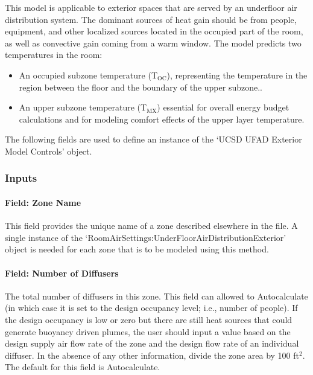 This model is applicable to exterior spaces that are served by an underfloor air distribution system. The dominant sources of heat gain should be from people, equipment, and other localized sources located in the occupied part of the room, as well as convective gain coming from a warm window. The model predicts two temperatures in the room:

\begin{itemize}
\item
  An occupied subzone temperature (T\(_{\mathrm{OC}}\)), representing the temperature in the region between the floor and the boundary of the upper subzone..
\item
  An upper subzone temperature (T\(_{\mathrm{MX}}\)) essential for overall energy budget calculations and for modeling comfort effects of the upper layer temperature.
\end{itemize}

The following fields are used to define an instance of the `UCSD UFAD Exterior Model Controls' object.

\subsubsection{Inputs}\label{inputs-11-016}

\paragraph{Field: Zone Name}\label{field-zone-name-7-003}

This field provides the unique name of a zone described elsewhere in the file. A single instance of the `RoomAirSettings:UnderFloorAirDistributionExterior' object is needed for each zone that is to be modeled using this method.

\paragraph{Field: Number of Diffusers}\label{field-number-of-diffusers-1}

The total number of diffusers in this zone. This field can allowed to Autocalculate (in which case it is set to the design occupancy level; i.e., number of people). If the design occupancy is low or zero but there are still heat sources that could generate buoyancy driven plumes, the user should input a value based on the design supply air flow rate of the zone and the design flow rate of an individual diffuser. In the absence of any other information, divide the zone area by 100 ft\(^{2}\). The default for this field is Autocalculate.

